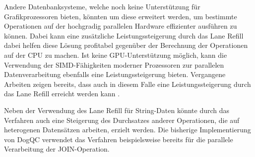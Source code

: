 Andere Datenbanksysteme, welche noch keine Unterstützung für Grafikprozessoren bieten, könnten um diese erweitert werden, um bestimmte Operationen auf der hochgradig parallelen Hardware effizienter ausführen zu können.
Dabei kann eine zusätzliche Leistungssteigerung durch das Lane Refill dabei helfen diese Lösung profitabel gegenüber der Berechnung der Operationen auf der CPU zu machen.
Ist keine GPU-Unterstützung möglich, kann die Verwendung der SIMD-Fähigkeiten moderner Prozessoren zur parallelen Datenverarbeitung ebenfalls eine Leistungssteigerung bieten.
Vergangene Arbeiten zeigen bereits, dass auch in diesem Falle eine Leistungssteigerung durch das Lane Refill erreicht werden kann \cite{Lang2018}.

Neben der Verwendung des Lane Refill für String-Daten könnte durch das Verfahren auch eine Steigerung des Durchsatzes anderer Operationen, die auf heterogenen Datensätzen arbeiten, erzielt werden.
Die bisherige Implementierung von DogQC verwendet das Verfahren beispielsweise bereits für die parallele Verarbeitung der JOIN-Operation.